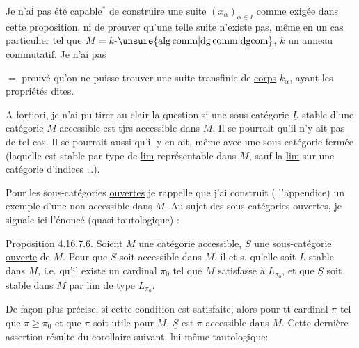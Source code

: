 Je n'ai pas été capable$^{*}$%
 de construire une suite $(x_\alpha)_{\alpha\in I}$ comme exigée dans cette proposition, ni de prouver qu'une telle suite n'existe pas, même en un cas particulier tel que $M=k\text{-}\unsure{\mathrm{alg\,comm}|\mathrm{dg\,comm}|\mathrm{dgcom}}$, $k$ un anneau commutatif.  Je n'ai pas



$=$ prouvé qu'on ne puisse trouver une suite transfinie de \uline{corps} $k_\alpha$, ayant les propriétés dites.

A fortiori, je n'ai pu tirer au clair la question si une sous-catégorie $\underline L$ stable d'une catégorie $M$ accessible est tjrs%
 accessible dans $M$. Il se pourrait qu'il n'y ait pas de tel cas. Il se pourrait aussi qu'il y en ait, même avec une sous-catégorie fermée (laquelle est stable par  type de \uline{lim} représentable dans $M$, sauf la \uline{lim} sur une catégorie d'indices \ldots).

Pour les sous-catégories \uline{ouvertes} je rappelle que j'ai construit ( l'appendice) un exemple d'une   non accessible dans $M$. Au sujet des sous-catégories ouvertes, je signale ici l'énoncé (quasi tautologique) :




\uline{Proposition} 4.16.7.6. Soient $M$ une catégorie accessible, $\underline S$ une sous-catégorie \uline{ouverte} de $M$. Pour que $\underline S$ soit accessible dans $M$, il  et s. qu'elle soit $\underline L$-stable dans $M$, i.e. qu'il existe un cardinal $\pi_0$ tel que $M$ satisfasse à $L_{\pi_0}$, et que $\underline S$ soit stable dans $M$ par \uline{lim} de type $L_{\pi_0}$.

De façon plus précise, si cette condition est satisfaite, alors pour tt cardinal $\pi$ tel que $\pi\geq\pi_0$ et que $\pi$ soit utile pour $M$, $\underline S$ est $\pi$-accessible dans $M$.  Cette dernière assertion résulte du  corollaire suivant, lui-même tautologique:

